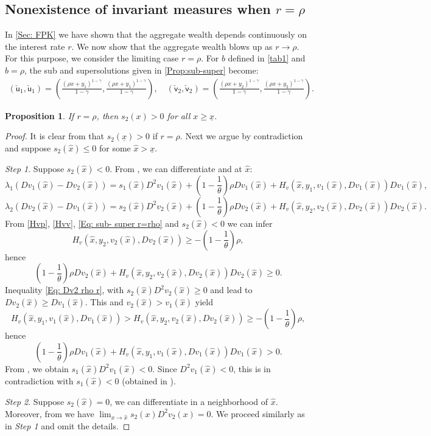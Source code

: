 \documentclass[11pt]{article}
\numberwithin{equation}{section}
\newtheorem{prop}[thm]{Proposition}
\theoremstyle{definition}
\def\su{{\mathsf{u}}}
\def\sv{{\mathsf{v}}}
\newcommand{\ux}{{\underline x}}
\newcommand{\beq}{\begin{equation}}
\newcommand{\eeq}{\end{equation}}
\newcommand{\hx}{\hat{x}}
\newcommand{\lc}{\left(}
\newcommand{\rc}{\right)}
\theoremstyle{plain}
\begin{document}
\subsection{Nonexistence of invariant measures when $r=\rho$}
{In \cref{Sec: FPK} we have shown that the aggregate wealth depends continuously on the interest rate $r$. We now show that the aggregate wealth blows up as $r\to \rho$. For this purpose, we consider the limiting case $r=\rho$.  For $b$ defined in \cref{tab1} and $b=\rho$, the sub and supersolutions given in \cref{Prop:sub-super} become:}
\beq\label{Eq: sub- super r=rho}
\begin{aligned}
(\check{\su}_1,\check{\su}_1)=\lc \frac{(\rho x+y_1)^{1-\gamma}}{1-\gamma},\frac{(\rho x+y_1)^{1-\gamma}}{1-\gamma}\rc,\quad
(\check{\sv}_2,\check{\sv}_2)=\lc \frac{(\rho x+y_2)^{1-\gamma}}{1-\gamma},\frac{(\rho x+y_2)^{1-\gamma}}{1-\gamma}\rc.
\end{aligned}
\eeq
\begin{prop}
If $r=\rho$, then $s_2(x)>0$ for all $x\geq \ux$. 
\end{prop}
\begin{proof}
It is clear from  that $s_2(\ux)>0$ if $r=\rho$.
Next we argue by contradiction and suppose $s_2(\hx)\leq 0$ for some $\hx>\ux$. \par
{\it{Step 1}}. Suppose $s_2(\hx)< 0$. From , we can differentiate  and  at $\hx$:
\beq\label{Eq: Dv1 rho}
\lambda_1\lc Dv_1(\hx)-Dv_2(\hx)\rc=s_1(\hx)D^2v_1(\hx)+\lc 1-\frac{1}{\theta}\rc \rho Dv_1(\hx)+H_v(\hx,y_1,v_1(\hx),Dv_1(\hx))Dv_1(\hx),
\eeq
\beq\label{Eq: Dv2 rho}
\lambda_2\lc Dv_2(\hx)-Dv_1(\hx)\rc=s_2(\hx)D^2v_2(\hx)+\lc 1-\frac{1}{\theta}\rc \rho Dv_2(\hx)+H_v(\hx,y_2,v_2(\hx),Dv_2(\hx))Dv_2(\hx).
\eeq
From \cref{Hvp}, \cref{Hvv}, \cref{Eq: sub- super r=rho} and $s_2(\hx)< 0$ we can infer
$$
H_v(\hx,y_2,v_2(\hx),Dv_2(\hx))\geq -\lc 1-\frac{1}{\theta}\rc \rho ,
$$
hence
\beq\label{Eq: Dv2 rho r}
\lc 1-\frac{1}{\theta}\rc \rho Dv_2(\hx)+H_v(\hx,y_2,v_2(\hx),Dv_2(\hx))Dv_2(\hx)\geq 0. 
\eeq
Inequality \eqref{Eq: Dv2 rho r}, with $s_2(\hx)D^2v_2(\hx)\geq 0$ and  lead to $Dv_2(\hx)\geq Dv_1(\hx)$. This and $v_2(\hx)> v_1(\hx)$ yield
$$
H_v(\hx,y_1,v_1(\hx),Dv_1(\hx))>H_v(\hx,y_2,v_2(\hx),Dv_2(\hx))\geq -\lc 1-\frac{1}{\theta}\rc \rho,
$$
hence 
$$
\lc 1-\frac{1}{\theta}\rc \rho Dv_1(\hx)+H_v(\hx,y_1,v_1(\hx),Dv_1(\hx))Dv_1(\hx)>0.
$$
From , we obtain $s_1(\hx)D^2v_1(\hx)<0$. Since $D^2v_1(\hx)<0$, this is in contradiction with $s_1(\hx)<0$ (obtained in ).\par
{\it{Step 2}}. Suppose $s_2(\hx)=0$, we can differentiate  in a neighborhood of $\hx$. Moreover, from  we have $\lim_{x\to \hx}s_2(x)D^2v_2(x)=0$. We proceed similarly as in {\it{Step 1}} and omit the details. 
\end{proof}
\end{document}
